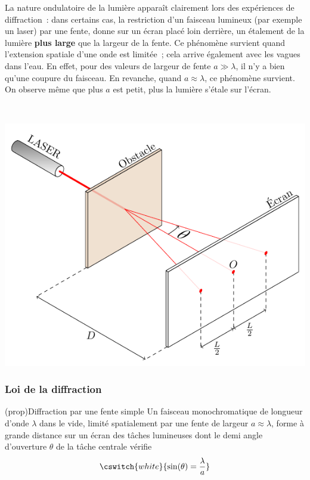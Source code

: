 \documentclass[../../main/main.tex]{subfiles}
\begin{document}
\noindent
\begin{minipage}[t]{.48\linewidth}
	La nature ondulatoire de la lumière apparaît clairement lors des expériences de
	diffraction~: dans certains cas, la restriction d'un faisceau lumineux (par
	exemple un laser) par une fente, donne sur un écran placé loin derrière, un
	étalement de la lumière \textbf{plus large} que la largeur de la fente.
	\smallbreak
	Ce phénomène survient quand l'extension spatiale d'une onde est limitée~; cela
	arrive également avec les vagues dans l'eau. En effet, pour des valeurs de
	largeur de fente $a \gg \lambda$, il n'y a bien qu'une coupure du faisceau. En
	revanche, quand $a \approx \lambda$, ce phénomène survient. On observe même que
	plus $a$ est petit, plus la lumière s'étale sur l'écran.
\end{minipage}
\hfill
\begin{minipage}[t]{.48\linewidth}
	~
	\vspace*{-30pt}
	\begin{center}
		\includegraphics[width=.8\linewidth]{diffraction}
		\label{fig:diff_las}
	\end{center}
\end{minipage}

\subsubsection{Loi de la diffraction}

\begin{tcb}(prop){Diffraction par une fente simple}
	Un faisceau monochromatique de longueur d'onde $\lambda$ dans le vide,
	limité spatialement par une fente de largeur $a \approx \lambda$, forme à
	grande distance sur un écran des tâches lumineuses dont le demi angle
	d'ouverture $\theta$ de la tâche centrale vérifie
	\[
		\cswitch{white}{
			\sin(\theta) = \frac{\lambda}{a}
		}
	\]
\end{tcb}
\end{document}
